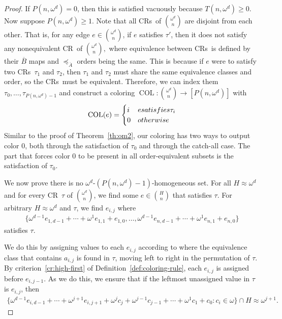 \documentclass[11pt]{article}
\newcommand{\om}{\omega}
\newcommand{\oequiv}{\approx}
\newcommand{\COL}{\operatorname{COL}}
\newcommand{\crulenospace}{CR}
\newcommand{\crule}{\crulenospace~}
\newcommand{\crules}{\crulenospace s~}
\newcommand{\xleq}{\preceq_{\overline{A}}}
\newcommand{\assny}{\overline{B}}
\newcommand{\numpoints}{n}
\newcommand{\inumpoints}{i}
\newcommand{\idegr}{j}
\newcommand{\commonconst}{a}
\theoremstyle{plain}
\theoremstyle{definition}
\begin{document}
\begin{proof}
If $P(\numpoints,\om^d) = 0$, then this is satisfied vacuously because $T(\numpoints, \om^d) \geq 0$. Now suppose $P(\numpoints,\om^d) \geq 1$. Note that all \crules of $\binom{\om^d}{\numpoints}$ are disjoint from each other. That is, for any edge $e \in \binom{\om^d}{\numpoints}$, if $e$ satisfies $\tau'$, then it does not satisfy any nonequivalent \crule of $\binom{\om^d}{\numpoints},$ where
equivalence between \crules is defined by their $\assny$ maps and $\xleq$ orders being
the same. This is because if $e$ were to satisfy two \crules $\tau_1$ and $\tau_2$, then $\tau_1$ and $\tau_2$ must share the same equivalence classes and order, so the \crules must be equivalent. Therefore, we can index them $\tau_0, \ldots, \tau_{P(\numpoints, \om^d)-1}$ and construct a coloring $\COL \colon \binom{\om^d}{\numpoints} \to [P(\numpoints, \om^d)]$ with\begin{align*}
    \COL(e) = \begin{cases}
    i & e \textnormal{ satisfies } \tau_i\\
    0 & \textnormal{otherwise}
    \end{cases}
\end{align*}
Similar to the proof of Theorem~\ref{th:om2}, our coloring has two ways to output color 0, both 
through the satisfaction of $\tau_0$ and through the catch-all case. The part that forces 
color 0 to be present in all order-equivalent subsets is the satisfaction of $\tau_0$.

We now prove there is no $\omega^d$-$(P(\numpoints,\om^d)-1)$-homogeneous set. 
For all $H \oequiv \om^{d}$ and 
for every \crule $\tau$ of $\binom{\om^d}{\numpoints}$, 
we find some $e \in \binom{H}{\numpoints}$ that satisfies $\tau$.
For arbitrary $H \oequiv \om^{d}$ and $\tau$, we find $e_{\inumpoints,\idegr}$ where 
\begin{align*}
    \{\om^{d-1} e_{1,d-1} + \cdots + \om^{1} e_{1,1} + e_{1,0}, \ldots,
    \om^{d-1} e_{\numpoints,d-1} + \cdots + \om^{1} e_{\numpoints,1} + e_{\numpoints,0}\}
\end{align*}
satisfies $\tau$.

We do this by assigning values to each $e_{\inumpoints,\idegr}$ according to where the equivalence class
that contains $\commonconst_{\inumpoints,\idegr}$ is found in $\tau$, moving left to right in the permutation of $\tau$. By criterion~\ref{cr:high-first}
of Definition~\ref{def:coloring-rule}, 
each $e_{\inumpoints,\idegr}$ is assigned before $e_{\inumpoints,\idegr-1}$. As we do this, we ensure that if the leftmost unassigned value in $\tau$ is $e_{\inumpoints,\idegr}$, then \begin{multline*}\{ \om^{d-1} e_{\inumpoints,d-1} + \cdots + \om^{\idegr+1} e_{\inumpoints,\idegr+1} + \om^\idegr c_{\idegr} + \om^{\idegr-1} c_{\idegr-1} + \cdots + \om^1 c_1 + c_0 : c_i \in \om\} \cap H \oequiv \om^{\idegr+1}.\end{multline*}


\end{proof}
\end{document}

